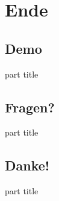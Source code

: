 \documentclass[11pt]{beamer}
\begin{document}
\section*{Ende}
\subsection*{Demo}
\begin{frame}
  \begin{centering}
    \begin{beamercolorbox}[sep=12pt,center]{part title}
      \par
    \end{beamercolorbox}
  \end{centering}
\end{frame}

\subsection*{Fragen?}
\begin{frame}
  \begin{centering}
    \begin{beamercolorbox}[sep=12pt,center]{part title}
      \par
    \end{beamercolorbox}
  \end{centering}
\end{frame}
\subsection*{Danke!}
\begin{frame}
  \begin{centering}
    \begin{beamercolorbox}[sep=12pt,center]{part title}
      \par
    \end{beamercolorbox}
  \end{centering}
\end{frame}















\end{document}

